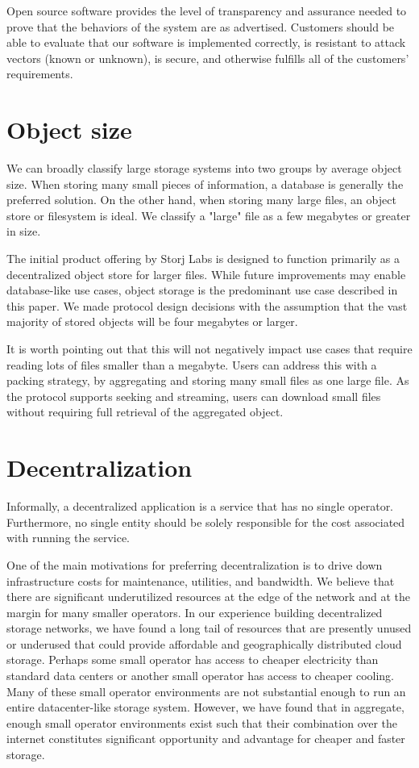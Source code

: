 \documentclass[11pt,fleqn,openany]{book}
\begin{document}
Open source software
provides the level of transparency and assurance needed to prove that the
behaviors of the system are as advertised. Customers should be able to
evaluate that our software is implemented correctly, is resistant to
attack vectors (known or unknown), is secure, and otherwise fulfills all
of the customers' requirements.

\section{Object size}

We can broadly classify large storage systems into two groups by average
object size. When storing many small pieces of information, a
database is generally the preferred solution.
On the other hand, when storing many large
files, an object store or filesystem is ideal. We classify a "large" file as a
few megabytes or greater in size.

The initial product offering by Storj Labs is designed to function primarily as
a decentralized object store for larger files.
While future improvements may enable
database-like use cases, object storage is the predominant use case described in
this paper. We made protocol design decisions with the assumption that the
vast majority of stored objects will be four megabytes or larger.

It is worth pointing out that this will not negatively impact use cases that
require reading lots of files smaller than a megabyte. Users can address this
with a packing strategy, by aggregating and storing many small files as one
large file.
As the protocol supports seeking and streaming, users can download small files
without requiring full retrieval of the aggregated object.

\section{Decentralization}

Informally, a decentralized application is a service that has no single
operator. Furthermore, no single entity should be solely responsible for the
cost associated with running the service.

One of the main motivations for preferring decentralization is to drive
down infrastructure costs for maintenance, utilities, and bandwidth.
We believe that there
are significant underutilized resources at the edge of the network and at
the margin for many smaller operators. In our experience building decentralized
storage networks, we have found a long tail of resources that are presently
unused or underused that could provide affordable and
geographically distributed cloud storage. Perhaps some small operator
has access to cheaper electricity than standard data centers or another small
operator has access to cheaper cooling. Many of these small operator
environments are not substantial enough to run an entire datacenter-like
storage system. However, we have found that in aggregate, enough small operator
environments exist such that their combination over the internet constitutes
significant opportunity and advantage for cheaper and faster storage.
\end{document}
